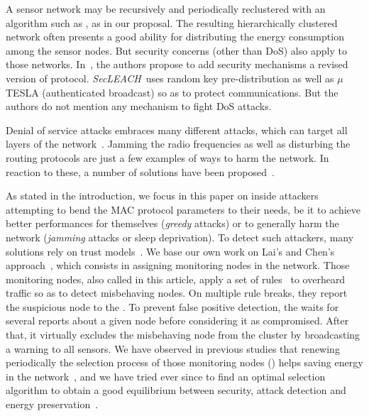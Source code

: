 
A sensor network may be recursively and periodically reclustered with an algorithm such as \leach, as in our proposal.
The resulting hierarchically clustered network often presents a good ability for distributing the energy consumption among the sensor nodes.
But security concerns (other than DoS) also apply to those networks.
In~\cite{OFVWBDL07}, the authors propose to add security mechanisms \via a revised version of \leach protocol.
\textit{SecLEACH}\ uses random key pre-distribution as well as $\mu$TESLA (authenticated broadcast) so as to protect communications.
But the authors do not mention any mechanism to fight DoS attacks.





Denial of service attacks embraces many different attacks, which can target all layers of the network~\cite{VS10}.
Jamming the radio frequencies as well as disturbing the routing protocols are just a few examples of ways to harm the network.
In reaction to these, a number of solutions have been proposed~\cite{SSS11}.

As stated in the introduction, we focus in this paper on inside attackers attempting to bend the MAC protocol parameters to their needs, be it to achieve better performances for themselves (\emph{greedy} attacks) or to generally harm the network (\emph{jamming} attacks or sleep deprivation).
To detect such attackers, many solutions rely on trust models~\cite{MC10}.
We base our own work on Lai's and Chen's approach~\cite{LC08}, which consists in assigning monitoring nodes in the network.
Those monitoring nodes, also called \cns in this article, apply a set of rules~\cite{RKKK13} to overheard traffic so as to detect misbehaving nodes.
On multiple rule breaks, they report the suspicious node to the \ch.
To prevent false positive detection, the \CH waits for several reports about a given node before considering it as compromised.
After that, it virtually excludes the misbehaving node from the cluster by broadcasting a warning to all sensors.
We have observed in previous studies that renewing periodically the selection process of those monitoring nodes (\cns) helps saving energy in the network~\cite{BMM13}, and we have tried ever since to find an optimal selection algorithm to obtain a good equilibrium between security, attack detection and energy preservation~\cite{MMB14}.
